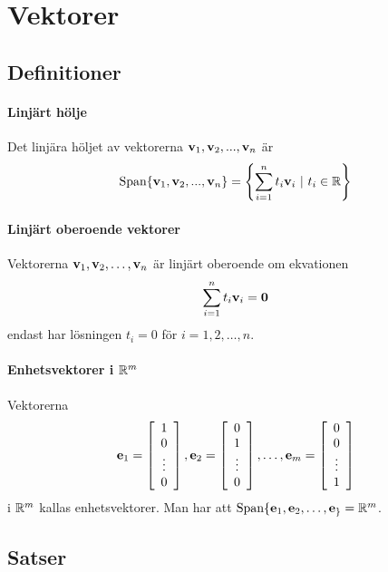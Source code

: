 \section{Vektorer}

\subsection{Definitioner}

\paragraph{Linjärt hölje}
Det linjära höljet av vektorerna $\vectorbold{v}_1, \vectorbold{v}_2, ..., \vectorbold{v}_n$ är
\begin{align*}
	\Span\{\vectorbold{v}_1, \vectorbold{v}_2, ..., \vectorbold{v}_n\} = \left\{\sum\limits_{i = 1}^{n} t_i\vectorbold{v}_i\ |\ t_i\in\R \right\}
\end{align*}

\paragraph{Linjärt oberoende vektorer}
Vektorerna $\vect{v}_1, \vect{v}_2, \dots, \vect{v}_n$ är linjärt oberoende om ekvationen
\begin{align*}
	\sum\limits_{i = 1}^{n}t_i\vect{v}_i = \vect{0}
\end{align*}
endast har lösningen $t_i = 0$ för $i = 1, 2, \dots, n$.

\paragraph{Enhetsvektorer i $\mathbb{R}^m$}
Vektorerna
\begin{align*}
	\vect{e}_1 =
	\left[\begin{array}{c}
    	1    \\
    	0    \\
    	\vdots \\
	    0
	\end{array}\right]
	, \vect{e}_2 =
	\left[\begin{array}{c}
    	0    \\
    	1    \\
    	\vdots \\
	    0
	\end{array}\right]
	, \dots, \vect{e}_m =
	\left[\begin{array}{c}
    	0    \\
    	0    \\
    	\vdots \\
	    1
	\end{array}\right]
\end{align*}
i $\mathbb{R}^m$ kallas enhetsvektorer. Man har att $\Span\{\vect{e}_1, \vect{e}_2, \dots, \vect{e}_\} = \R^{m}$.

\subsection{Satser}